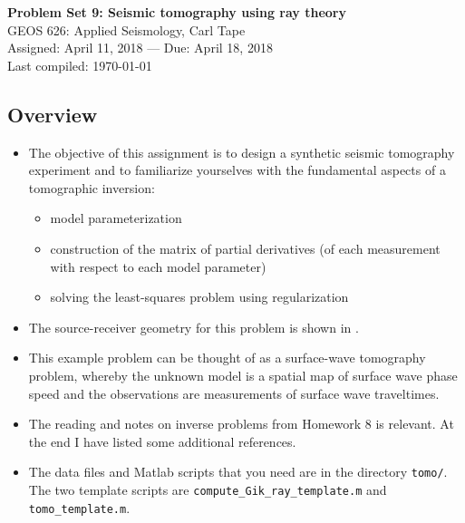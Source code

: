 \documentclass[11pt,titlepage,fleqn]{article}
\begin{document}

\begin{spacing}{1.2}
\centering
{\large \bf Problem Set 9: Seismic tomography using ray theory} \\
GEOS 626: Applied Seismology, Carl Tape \\
Assigned: April 11, 2018 --- Due: April 18, 2018 \\
Last compiled: \today
\end{spacing}


\subsection*{Overview}

\begin{itemize}
\item The objective of this assignment is to design a synthetic seismic tomography experiment and to familiarize yourselves with the fundamental aspects of a tomographic inversion:
%
\begin{itemize}
\item model parameterization
\item construction of the matrix of partial derivatives (of each measurement with respect to each model parameter)
\item solving the least-squares problem using regularization
\end{itemize}

\item The source-receiver geometry for this problem is shown in .

\item This example problem can be thought of as a surface-wave tomography problem, whereby the unknown model is a spatial map of surface wave phase speed and the observations are measurements of surface wave traveltimes.

\item The reading and notes on inverse problems from Homework 8 is relevant.
At the end I have listed some additional references.
\nocite{Tape2007,Menke,AsterE2,Tarantola2005}

\item 
The data files and Matlab scripts that you need are in the directory \verb+tomo/+. \\
The two template scripts are \verb+compute_Gik_ray_template.m+ and \verb+tomo_template.m+.

\end{itemize}
\end{document}
